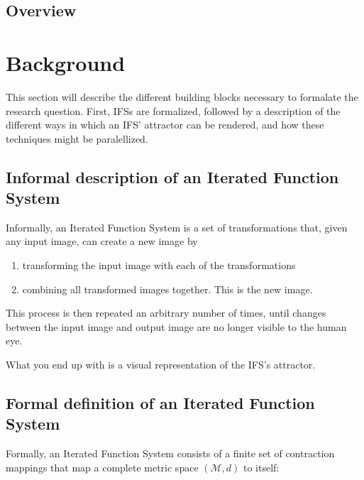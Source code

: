 \documentclass[11pt]{article}
\begin{document}
\subsection{Overview}
\label{sec:org80fbb4e}


\section{Background}
\label{sec:org3aadd34}
\label{section:background}

This section will describe the different building blocks necessary to formalate the research question.
First, IFSs are formalized, followed by a description of the different ways in which an IFS' attractor can be rendered, 
and how these techniques might be paralellized.

\subsection{Informal description of an Iterated Function System}
\label{sec:orgee658f7}

Informally, an Iterated Function System is a set of transformations that, given any input image, can create a new image by

\begin{enumerate}
\item transforming the input image with each of the transformations
\item combining all transformed images together. This is the new image.
\end{enumerate}

This process is then repeated an arbitrary number of times, until changes between the input image and output image are no longer visible to the human eye.

What you end up with is a visual representation of the IFS's attractor.




\subsection{Formal definition of an Iterated Function System}
\label{sec:org00b805d}

Formally, an Iterated Function System consists of a finite set of contraction mappings that map a complete metric space \((\mathcal{M}, d)\) to itself:
\end{document}
